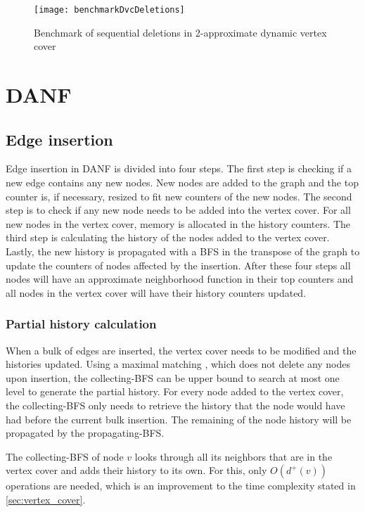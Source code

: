 \begin{figure}[h]
\centering
\texttt{[image: benchmarkDvcDeletions]}    
\captionsetup{justification=centering}
\caption {Benchmark of sequential deletions in 2-approximate dynamic vertex cover}
\label{fig:benchmarkDvcDeletions}
\end{figure}


\section{DANF}
\subsection{Edge insertion}

Edge insertion in DANF is divided into four steps. The first step is checking if a new edge contains any new nodes. New nodes are added to the graph and the top counter is, if necessary, resized to fit new counters of the new nodes. The second step is to check if any new node needs to be added into the vertex cover. For all new nodes in the vertex cover, memory is allocated in the history counters. The third step is calculating the history of the nodes added to the vertex cover. Lastly, the new history is propagated with a BFS in the transpose of the graph to update the counters of nodes affected by the insertion. After these four steps all nodes will have an approximate neighborhood function in their top counters and all nodes in the vertex cover will have their history counters updated. 

\subsubsection{Partial history calculation}
When a bulk of edges are inserted, the vertex cover needs to be modified and the histories updated. Using a maximal matching \cite{2appdynvc}, which does not delete any nodes upon insertion, the collecting-BFS can be upper bound to search at most one level to generate the partial history. For every node added to the vertex cover, the collecting-BFS only needs to retrieve the history that the node would have had before the current bulk insertion. The remaining of the node history will be propagated by the propagating-BFS.

The collecting-BFS of node $v$ looks through all its neighbors that are in the vertex cover and adds their history to its own. For this, only $O(d^+(v))$ operations are needed, which is an improvement to the time complexity stated in \ref{sec:vertex_cover}. \\

